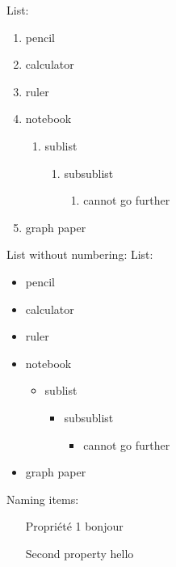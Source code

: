 \documentclass[a4paper,11pt]{article}
\begin{document}
List:
\begin{enumerate}
\item pencil
\item calculator
\item ruler
\item notebook
\begin{enumerate}
\item sublist
\begin{enumerate}
\item subsublist
\begin{enumerate}
\item cannot go further
\end{enumerate}
\end{enumerate}
\end{enumerate}
\item graph paper
\end{enumerate}

List without numbering:
List:
\begin{itemize}
\item pencil
\item calculator
\item ruler
\item notebook
\begin{itemize}
\item sublist
\begin{itemize}
\item subsublist
\begin{itemize}
\item cannot go further
\end{itemize}
\end{itemize}
\end{itemize}
\item graph paper
\end{itemize}

Naming items:
\begin{enumerate}
\item[Propriété 1] bonjour
\item[Second property] hello
\end{enumerate}
\end{document}
